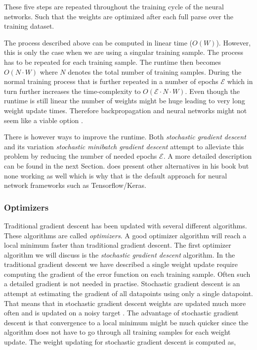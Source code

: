 These five steps are repeated throughout the training cycle of the neural
networks. Such that the weights are optimized after each full parse over the
training dataset.

The process described above can be computed in linear time ($O(W)$). However,
this is only the case when we are using a singular training sample. The process
has to be repeated for each training sample. The runtime then becomes $O(N\cdot
W)$ where $N$ denotes the total number of training samples. During the normal
training process that is further repeated in a number of epochs $\mathcal{E}$
which in turn further increases the time-complexity to $O(\mathcal{E}\cdot
N\cdot W)$. Even though the runtime is still linear the number of weights might
be huge leading to very long weight update times. Therefore backpropagation and
neural networks might not seem like a viable option \cite{Bishop}.

There is however ways to improve the runtime. Both \textit{stochastic gradient
descent} and its variation \textit{stochastic minibatch gradient descent}
attempt to alleviate this problem by reducing the number of needed epochs
$\mathcal{E}$. A more detailed description can be found in the next Section.
\citet{Bishop} does present other alternatives in his book but none working as
well which is why that is the default approach for neural network frameworks
such as Tensorflow/Keras.


\subsubsection{Optimizers}\label{subsubsec:optimizers}

Traditional gradient descent has been updated with several different algorithms.
These algorithms are called \textit{optimizers}. A good optimizer algorithm
will reach a local minimum faster than traditional gradient descent. The first
optimizer algorithm we will discuss is the \textit{stochastic gradient descent}
algorithm. In the traditional gradient descent we have described a single
weight update require computing the gradient of the error function on each
training sample. Often such a detailed gradient is not needed in practise.
Stochastic gradient descent is an attempt at estimating the gradient of all
datapoints using only a single datapoint. That means that in stochastic gradient
descent weights are updated much more often and is updated on a noisy target
\citep{Bishop}. The advantage of stochastic gradient descent is that convergence
to a local minimum might be much quicker since the algorithm does not have to
go through all training samples for each weight update. The weight updating for
stochastic gradient descent is computed as,

